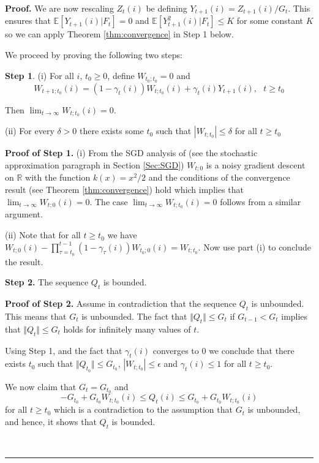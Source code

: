 \documentclass[letter,11pt]{article}
\newenvironment {proof}[1][Proof]{\noindent \textbf {#1.} }{\ \rule {0.5em}{0.5em}}
\begin{document}
\begin{proof}
We are now rescaling $Z_{t}(i)$ be defining $Y_{t+1}(i) = Z_{t+1}(i)/G_{t}$. This ensures that $\mathbb{E} [Y_{t+1} (i) | F_{t} ] =0$ and $\mathbb{E} [Y_{t+1}^{2} (i) | F_{t} ] \leq K $ for some constant $K$ so we can apply Theorem \ref{thm:convergence} in Step 1 below.  

     We proceed by proving the following two steps:

     \textbf{Step 1}. (i) For all $i$, $t_{0} \geq 0$, define  $W_{t_{0}; t_{0} } = 0$ and
     $$ W_{t+1;t_{0}} (i) = (1-\gamma_{t}(i)) W_{t;t_{0}} (i) + \gamma_{t}(i) Y_{t+1} (i) , \text{ } t \geq t_{0} $$

     Then $\lim _{t\rightarrow \infty} W_{t; t_{0}}(i) = 0$.

(ii) For every $\delta >0 $ there exists some $t_{0}$ such that $|W_{t;t_{0}}| \leq \delta$  for all $t \geq t_{0}$
 
     \textbf{Proof of Step 1.}
(i) From the SGD analysis of 
(see the stochastic approximation paragraph in Section \ref{Sec:SGD}) $W_{t;0}$ is a noisy gradient descent on $\mathbb{R}$ with the function $k(x) = x^{2} /2$ and the conditions of the convergence result (see Theorem \ref{thm:convergence}) hold which implies that  $\lim _{t\rightarrow \infty} W_{t;0}(i) = 0$. 
The case $\lim _{t\rightarrow \infty} W_{t;t_{0}}(i) = 0$ follows from a similar argument. 



(ii) Note that for all $t \geq t_{0}$ we have 
$W_{t;0}(i) - \prod _{\tau = t_{0} } ^{t-1} (1-\gamma_{\tau}(i))W_{t_{0};0}(i)= W_{t;t_{0} }$. Now use part (i) to conclude the result. 

\textbf{Step 2.} The sequence $Q_{t}$ is bounded. 

\textbf{Proof of Step 2.} Assume in contradiction that the sequence $Q_{t}$ is unbounded. This means that $G_{t}$ is unbounded. The fact that  $\Vert Q_{t} \Vert   \leq  G_{t} $ if $G_{t-1} < G_{t}$ implies that $\Vert Q_{t} \Vert   \leq  G_{t} $ holds for infinitely many values of $t$. 

Using Step 1, and the fact that $\gamma_{t}(i)$ converges to $0$ we conclude that there exists $t_{0}$ such that $\Vert Q_{t_{0} } \Vert   \leq  G_{t_{0}}$, $|W_{t;t_{0} } | \leq \epsilon$ and $\gamma_{t}(i) \leq 1$ for all $t \geq t_{0}$. 

We now claim that $G_{t} = G_{t_{0}} $ and $$-G_{t_{0}} + G_{t_{0}}W_{t;t_{0} }(i) \leq Q_{t } (i)  \leq G_{t_{0}} + G_{t_{0}}W_{t;t_{0} }(i)$$ for all $t \geq t_{0}$ which is a contradiction to  the assumption that $G_{t}$ is unbounded, and hence, it shows that $Q_{t}$ is bounded.


\end{proof}
\end{document}
